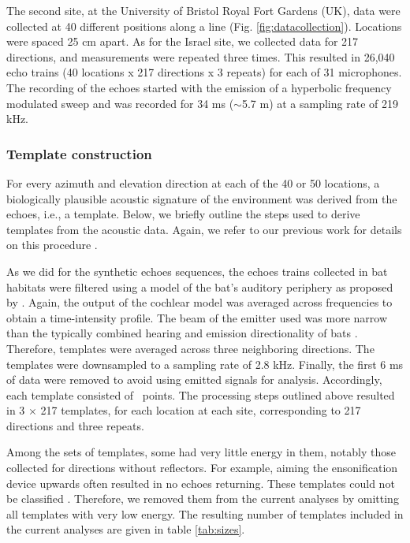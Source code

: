 \documentclass[preprint,5p]{elsarticle}
\begin{document}
The second site, at the University of Bristol Royal Fort Gardens (UK), data were collected at 40 different positions along a line (Fig. \ref{fig:datacollection}). Locations were spaced 25 cm apart. As for the Israel site, we collected data for 217 directions, and measurements were repeated three times. This resulted in 26,040 echo trains (40 locations x 217 directions x 3 repeats) for each of 31 microphones. The recording of the echoes started with the emission of a hyperbolic frequency modulated sweep and was recorded for 34 ms ($\sim$5.7 m) at a sampling rate of 219 kHz. 

\subsubsection{Template construction}

For every azimuth and elevation direction at each of the  40 or 50 locations, a biologically plausible acoustic signature of the environment was derived from the echoes, i.e., a template. Below, we briefly outline the steps used to derive templates from the acoustic data. Again, we refer to our previous work for details on this procedure \citep{Vanderelst2016}.

As we did for the synthetic echoes sequences, the echoes trains collected in bat habitats were filtered using a model of the bat's auditory periphery as proposed by \citet{Wiegrebe2008}. Again, the output of the cochlear model was averaged across frequencies to obtain a time-intensity profile. The beam of the emitter used was more narrow than the typically combined hearing and emission directionality of bats \citep{Vanderelst2010a,Reijniers2010,Jakobsen2012}. Therefore, templates were averaged across three neighboring directions. The templates were downsampled to a sampling rate of 2.8 kHz. Finally, the first 6 ms of data were removed to avoid using emitted signals for analysis. Accordingly, each template consisted of \pca\ points. The processing steps outlined above resulted in 3 $\times$ 217 templates, for each location at each site, corresponding to 217 directions and three repeats.

Among the sets of templates, some had very little energy in them, notably those collected for directions without reflectors. For example, aiming the ensonification device upwards often resulted in no echoes returning. These templates could not be classified \citep{Vanderelst2016}. Therefore, we removed them from the current analyses by omitting all templates with very low energy. The resulting number of templates included in the current analyses are given in table \ref{tab:sizes}.
\end{document}
